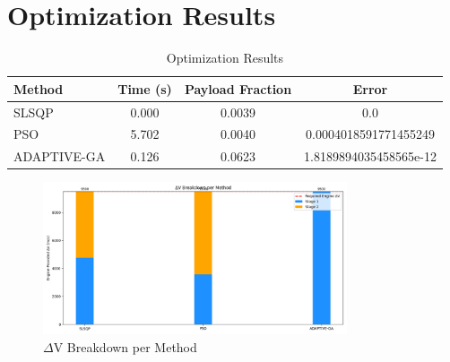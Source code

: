 \documentclass{article}
\begin{document}
\section{Optimization Results}
\begin{table}[h]
\centering
\begin{tabular}{|l|c|c|c|}
\hline
Method & Time (s) & Payload Fraction & Error \\
\hline
SLSQP & 0.000 & 0.0039 & 0.0 \\
PSO & 5.702 & 0.0040 & 0.0004018591771455249 \\
ADAPTIVE-GA & 0.126 & 0.0623 & 1.8189894035458565e-12 \\
\hline
\end{tabular}
\caption{Optimization Results}
\end{table}
\begin{figure}[h]
\centering
\includegraphics[width=0.8\textwidth]{dv_breakdown.png}
\caption{$\Delta$V Breakdown per Method}
\end{figure}
\end{document}
